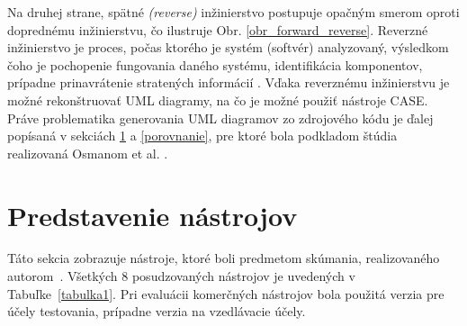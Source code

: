 \documentclass[10pt,twoside,slovak,a4paper]{article}
\begin{document}
Na druhej strane, spätné \textit{(reverse)} inžinierstvo postupuje opačným smerom oproti doprednému inžinierstvu, čo ilustruje Obr.  \ref{obr_forward_reverse}. 
Reverzné inžinierstvo je proces, počas ktorého je systém (softvér) analyzovaný, výsledkom čoho je pochopenie fungovania daného systému, identifikácia komponentov, prípadne prinavrátenie stratených informácií \cite{2010}.
Vďaka reverznému inžinierstvu je možné rekonštruovať UML diagramy, na čo je možné použiť nástroje CASE. Práve problematika generovania UML diagramov zo zdrojového kódu je ďalej popísaná v sekciách \ref{predstavenie} a \ref{porovnanie}, pre ktoré bola podkladom štúdia
realizovaná Osmanom et al. \cite{Osman:RE}. 


\section{Predstavenie nástrojov}\label{predstavenie}

Táto sekcia zobrazuje nástroje, ktoré boli predmetom skúmania, realizovaného autorom~\cite{Osman:RE}. Všetkých 8 posudzovaných nástrojov je uvedených v Tabuľke~\ref{tabulka1}. Pri evaluácii komerčných nástrojov bola použitá verzia pre účely testovania, prípadne verzia na vzedlávacie účely.

\begin{table}[h]
\centering
{}
\caption{Zoznam posudzovaných nástrojov (prevzaté a preložené z~\cite{Osman:RE})}\label{tabulka1}
\end{table}
\end{document}
